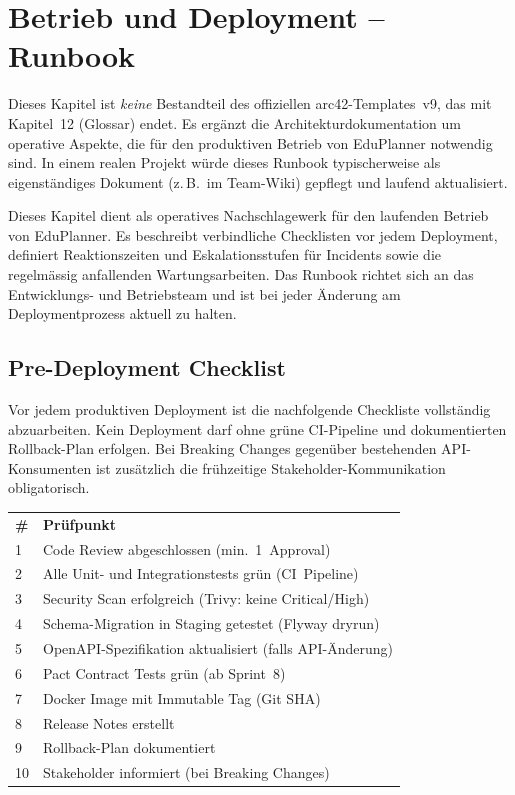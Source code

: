 \section{Betrieb und Deployment -- Runbook}

\begin{hinweis}
Dieses Kapitel ist \emph{keine} Bestandteil des offiziellen arc42-Templates~v9,
das mit Kapitel~12 (Glossar) endet. Es ergänzt die Architekturdokumentation um
operative Aspekte, die für den produktiven Betrieb von EduPlanner notwendig sind.
In einem realen Projekt würde dieses Runbook typischerweise als eigenständiges
Dokument (z.\,B.\ im Team-Wiki) gepflegt und laufend aktualisiert.
\end{hinweis}

Dieses Kapitel dient als operatives Nachschlagewerk für den laufenden Betrieb von EduPlanner. Es beschreibt verbindliche Checklisten vor jedem Deployment, definiert Reaktionszeiten und Eskalationsstufen für Incidents sowie die regelmässig anfallenden Wartungsarbeiten. Das Runbook richtet sich an das Entwicklungs- und Betriebsteam und ist bei jeder Änderung am Deploymentprozess aktuell zu halten.

\subsection{Pre-Deployment Checklist}

Vor jedem produktiven Deployment ist die nachfolgende Checkliste vollständig abzuarbeiten. Kein Deployment darf ohne grüne CI-Pipeline und dokumentierten Rollback-Plan erfolgen. Bei Breaking Changes gegenüber bestehenden API-Konsumenten ist zusätzlich die frühzeitige Stakeholder-Kommunikation obligatorisch.

\begin{tabularx}{\textwidth}{C{0.6cm} X}
  \color{white}\textbf{\#} & \color{white}\textbf{Prüfpunkt} \\
  1 & Code Review abgeschlossen (min.\ 1~Approval) \\
  2 & Alle Unit- und Integrationstests grün (CI~Pipeline) \\
  3 & Security Scan erfolgreich (Trivy: keine Critical/High) \\
  4 & Schema-Migration in Staging getestet (Flyway dryrun) \\
  5 & OpenAPI-Spezifikation aktualisiert (falls API-Änderung) \\
  6 & Pact Contract Tests grün (ab Sprint~8) \\
  7 & Docker Image mit Immutable Tag (Git SHA) \\
  8 & Release Notes erstellt \\
  9 & Rollback-Plan dokumentiert \\
  10 & Stakeholder informiert (bei Breaking Changes) \\
\end{tabularx}

